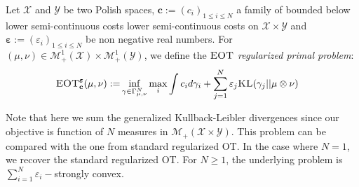 \begin{definition}
Let $\mathcal{X}$ and $\mathcal{Y}$ be two Polish spaces, $\mathbf{c}:=(c_i)_{1\leq i\leq N}$ a family of bounded below lower semi-continuous costs lower semi-continuous costs on $\mathcal{X}\times\mathcal{Y}$ and $\bm{\varepsilon}:=(\varepsilon_i)_{1\leq i\leq N}$ be non negative real numbers. For $(\mu,\nu)\in\mathcal{M}_+^{1}(\mathcal{X})\times\mathcal{M}_+^{1}(\mathcal{Y})$, we define the \emph{$\textsc{EOT}$ regularized primal problem}:
\begin{equation}
\vspace{-0.4cm}
\begin{aligned}
\MOT_{\mathbf{c}}^{\bm{\varepsilon}}(\mu,\nu):= & \inf\limits_{\gamma\in\Gamma_{\mu,\nu}^N}   \max_i\int c_id\gamma_i\label{eq-primal-entrop} 
+\sum_{j=1}^N \varepsilon_j\KL(\gamma_j||\mu\otimes \nu)\notag
\end{aligned}
\end{equation}
\end{definition}
Note that here we sum the generalized Kullback-Leibler divergences since our objective is function of $N$ measures in $\mathcal{M}_+(\mathcal{X}\times\mathcal{Y})$. This problem can be compared with the one from standard regularized OT. In the case where $N=1$, we recover the standard regularized OT. For $N\geq 1$, the underlying problem  is $\sum_{i=1}^{N}\varepsilon_i-$strongly convex.
